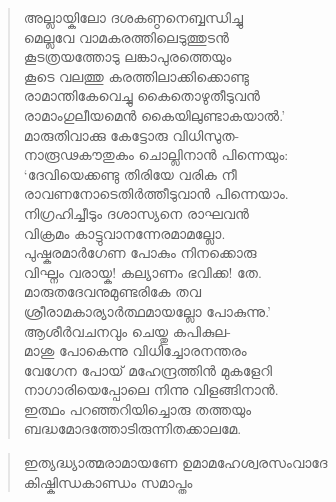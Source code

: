 \begin{verse}
അല്ലായ്കിലോ ദശകണ്ഠനെബ്ബന്ധിച്ചു\\
മെല്ലവേ വാമകരത്തിലെടുത്തുടന്‍\\
കൂടത്രയത്തോടു ലങ്കാപുരത്തെയും\\
കൂടെ വലത്തു കരത്തിലാക്കിക്കൊണ്ടു\\
രാമാന്തികേവെച്ചു കൈതൊഴുതീടുവന്‍\\
രാമാംഗുലീയമെന്‍ കൈയിലുണ്ടാകയാല്‍.’\\
മാരുതിവാക്കു കേട്ടോരു വിധിസുത-\\
നാരൂഢകൗതുകം ചൊല്ലിനാന്‍ പിന്നെയും:\\
‘ദേവിയെക്കണ്ടു തിരിയേ വരിക നീ\\
രാവണനോടെതിര്‍ത്തീടുവാന്‍ പിന്നെയാം.\\
നിഗ്രഹിച്ചീടും ദശാസ്യനെ രാഘവന്‍\\
വിക്രമം കാട്ടുവാനന്നേരമാമല്ലോ.\\
പുഷ്കരമാര്‍ഗേണ പോകും നിനക്കൊരു\\
വിഘ്നം വരായ്ക! കല്യാണം ഭവിക്ക! തേ.\\
മാരുതദേവനുമുണ്ടരികേ തവ\\
ശ്രീരാമകാര്യാര്‍ത്ഥമായല്ലോ പോകുന്നു.’\\
ആശീര്‍വചനവും ചെയ്തു കപികുല-\\
മാശു പോകെന്നു വിധിച്ചോരനന്തരം\\
വേഗേന പോയ് മഹേന്ദ്രത്തിന്‍ മുകളേറി\\
നാഗാരിയെപ്പോലെ നിന്നു വിളങ്ങിനാന്‍.\\
ഇത്ഥം പറഞ്ഞറിയിച്ചൊരു തത്തയും\\
ബദ്ധമോദത്തോടിരുന്നിതക്കാലമേ.
\end{verse}

\begin{verse}
ഇത്യദ്ധ്യാത്മരാമായണേ ഉമാമഹേശ്വരസംവാദേ\\
കിഷ്കിന്ധകാണ്ഡം സമാപ്തം
\end{verse}
